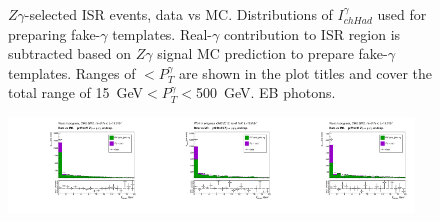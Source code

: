 \begin{figure}[htb]
\begin{center}
  \caption{$Z\gamma$-selected ISR events, data vs MC. Distributions of $I_{chHad}^{\gamma}$ used for preparing fake-$\gamma$ templates. Real-$\gamma$ contribution to ISR region is subtracted based on $Z\gamma$ signal MC prediction to prepare fake-$\gamma$ templates. Ranges of $<P_T^{\gamma}$ are shown in the plot titles and cover the total range of 15~GeV$<P_T^{\gamma}<$500~GeV. EB photons. }
  \label{fig:Zg_ISR_phoPFChIsoCorr_Barrel}
  \end{center}
\end{figure}

\begin{figure}[htb]
  \begin{center}
   \includegraphics[width=0.32\textwidth]{../figs/figs_v11/MUON_ZGamma/PrepareYields/c_TotalDATAvsMC_Endcap__phoPFChIsoCorrFSR_EXCLUDED_pt15to20_.pdf}\includegraphics[width=0.32\textwidth]{../figs/figs_v11/MUON_ZGamma/PrepareYields/c_TotalDATAvsMC_Endcap__phoPFChIsoCorrFSR_EXCLUDED_pt20to25_.pdf}\includegraphics[width=0.32\textwidth]{../figs/figs_v11/MUON_ZGamma/PrepareYields/c_TotalDATAvsMC_Endcap__phoPFChIsoCorrFSR_EXCLUDED_pt25to30_.pdf}\\

\end{center}
\end{figure}
